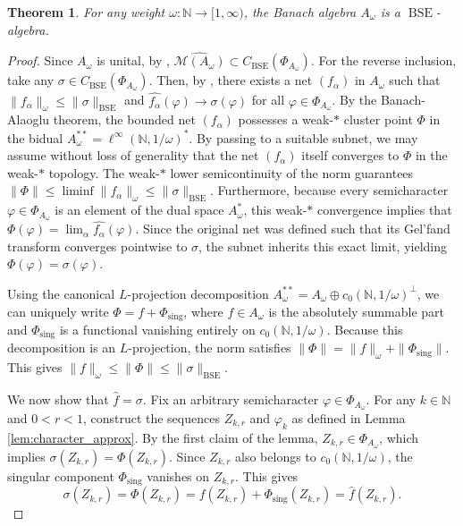 \documentclass{amsart}
\newtheorem{theorem}{Theorem}[section]
\theoremstyle{definition}
\theoremstyle{remark}
\numberwithin{equation}{section}
\begin{document}
\begin{theorem}\label{main}
For any weight $\omega: \mathbb N \to [1, \infty)$, the Banach algebra $A_\omega$ is a $\operatorname{BSE}$-algebra.
\end{theorem}
\begin{proof}
Since $A_\omega$ is unital, by \cite[Corollary 5]{takahasi1990}, $\widehat{\mathcal M(A_\omega)}\subset C_{\operatorname{BSE}}(\Phi_{A_\omega})$. For the reverse inclusion, take any $\sigma \in C_{\operatorname{BSE}}(\Phi_{A_\omega})$. Then, by \cite[Theorem 4(i)]{takahasi1990}, there exists a net $(f_\alpha)$ in $A_\omega$ such that $\|f_\alpha\|_\omega \leq \|\sigma\|_{\operatorname{BSE}}$ and $\widehat{f_\alpha}(\varphi) \to \sigma(\varphi)$ for all $\varphi \in \Phi_{A_\omega}$. By the Banach-Alaoglu theorem, the bounded net $(f_\alpha)$ possesses a weak-$*$ cluster point $\Phi$ in the bidual $A_\omega^{**} = \ell^\infty(\mathbb N, 1/\omega)^*$. By passing to a suitable subnet, we may assume without loss of generality that the net $(f_\alpha)$ itself converges to $\Phi$ in the weak-$*$ topology. The weak-$*$ lower semicontinuity of the norm guarantees $\|\Phi\| \leq \liminf \|f_\alpha\|_\omega \leq \|\sigma\|_{\operatorname{BSE}}$. Furthermore, because every semicharacter $\varphi \in \Phi_{A_\omega}$ is an element of the dual space $A_\omega^*$, this weak-$*$ convergence implies that $\Phi(\varphi) = \lim_\alpha \widehat{f_\alpha}(\varphi)$. Since the original net was defined such that its Gel'fand transform converges pointwise to $\sigma$, the subnet inherits this exact limit, yielding $\Phi(\varphi) = \sigma(\varphi)$.

Using the canonical $L$-projection decomposition $A_\omega^{**} = A_\omega \oplus c_0(\mathbb N, 1/\omega)^\perp$, we can uniquely write $\Phi = f + \Phi_{\text{sing}}$, where $f \in A_\omega$ is the absolutely summable part and $\Phi_{\text{sing}}$ is a functional vanishing entirely on $c_0(\mathbb N, 1/\omega)$. Because this decomposition is an $L$-projection, the norm satisfies $\|\Phi\| = \|f\|_\omega + \|\Phi_{\text{sing}}\|$. This gives $\|f\|_\omega \leq \|\Phi\| \leq \|\sigma\|_{\operatorname{BSE}}$.

We now show that $\widehat{f} = \sigma$. Fix an arbitrary semicharacter $\varphi \in \Phi_{A_\omega}$. For any $k \in \mathbb N$ and $0 < r < 1$, construct the sequences $Z_{k,r}$ and $\varphi_k$ as defined in Lemma \ref{lem:character_approx}. By the first claim of the lemma, $Z_{k,r} \in \Phi_{A_\omega}$, which implies $\sigma(Z_{k,r}) = \Phi(Z_{k,r})$. Since $Z_{k,r}$ also belongs to $c_0(\mathbb N, 1/\omega)$, the singular component $\Phi_{\text{sing}}$ vanishes on $Z_{k,r}$. This gives $$\sigma(Z_{k,r}) = \Phi(Z_{k,r}) = f(Z_{k,r}) + \Phi_{\text{sing}}(Z_{k,r}) = \widehat{f}(Z_{k,r}).$$


\end{proof}
\end{document}
